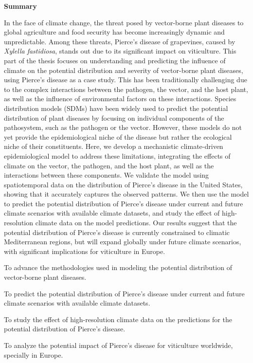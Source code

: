 \thispagestyle{empty}

\begin{center}
    \textbf{\Large Summary}
\end{center}

In the face of climate change, the threat posed by vector-borne plant diseases
to global agriculture and food security has become increasingly dynamic and
unpredictable. Among these threats, Pierce's disease of grapevines, caused by
\textit{Xylella fastidiosa}, stands out due to its significant impact on
viticulture. This part of the thesis focuses on understanding and predicting
the influence of climate on the potential distribution and severity of
vector-borne plant diseases, using Pierce's disease as a case study. This has
been traditionally challenging due to the complex interactions between the
pathogen, the vector, and the host plant, as well as the influence of
environmental factors on these interactions. Species distribution models (SDMs)
have been widely used to predict the potential distribution of plant
diseases by focusing on individual components of the pathosystem, such as the
pathogen or the vector. However, these models do not yet provide the
epidemiological niche of the disease but rather the ecological niche of their
constituents. Here, we develop a mechanistic climate-driven
epidemiological model to address these limitations, integrating the effects of
climate on the vector, the pathogen, and the host plant, as well as the
interactions between these components. We validate the model using
spatiotemporal data on the distribution of Pierce's disease in the United
States, showing that it accurately captures the observed patterns. We then use
the model to predict the potential distribution of Pierce's disease under
current and future climate scenarios with available climate datasets, and
study the effect of high-resolution climate data on the model predictions. Our
results suggest that the potential distribution of Pierce's disease is
currently constrained to climatic Mediterranean regions, but  will expand
globally under future climate scenarios, with significant implications
for viticulture in Europe.

\vspace{1cm}

\begin{objectiveslist}
    \item To advance the methodologies used in modeling the potential
    distribution of vector-borne plant diseases.

    \item To predict the potential distribution of Pierce's disease under
    current and future climate scenarios with available climate datasets.

    \item To study the effect of high-resolution climate data on the
    predictions for the potential distribution of Pierce's disease.

    \item To analyze the potential impact of Pierce's disease for viticulture
    worldwide, specially in Europe.
\end{objectiveslist}

